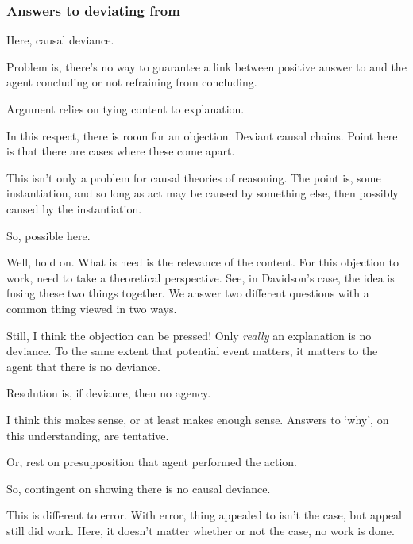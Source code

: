 \subsubsection{Answers to \qzS{} deviating from \qWhy{}}
\label{sec:probl-link-prop}

\begin{note}
  Here, causal deviance.
\end{note}

\begin{note}
  Problem is, there's no way to guarantee a link between positive answer to \qzS{} and the agent concluding or not refraining from concluding.
\end{note}

\begin{note}
  Argument relies on tying content to explanation.

  In this respect, there is room for an objection.
  Deviant causal chains.
  Point here is that there are cases where these come apart.

  This isn't only a problem for causal theories of reasoning.
  The point is, some instantiation, and so long as act may be caused by something else, then possibly caused by the instantiation.

  So, possible here.

  Well, hold on.
  What is need is the relevance of the content.
  For this objection to work, need to take a theoretical perspective.
  See, in Davidson's case, the idea is fusing these two things together.
  We answer two different questions with a common thing viewed in two ways.

  Still, I think the objection can be pressed!
  Only \emph{really} an explanation is no deviance.
  To the same extent that potential event matters, it matters to the agent that there is no deviance.

  {
    \color{red}
    Resolution is, if deviance, then no agency.
  }

  I think this makes sense, or at least makes enough sense.
  Answers to `why', on this understanding, are tentative.

  Or, rest on presupposition that agent performed the action.

  So, contingent on showing there is no causal deviance.

  This is different to error.
  With error, thing appealed to isn't the case, but appeal still did work.
  Here, it doesn't matter whether or not the case, no work is done.


\end{note}
